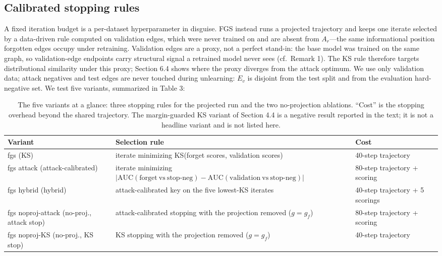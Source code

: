 \documentclass[pdflatex,sn-basic,Numbered]{sn-jnl}
\begin{document}
\subsection{Calibrated stopping rules}
A fixed iteration budget is a per-dataset hyperparameter in disguise. FGS instead runs a projected trajectory and keeps one iterate selected by a data-driven rule computed on validation edges, which were never trained on and are absent from $A_r$---the same informational position forgotten edges occupy under retraining. Validation edges are a proxy, not a perfect stand-in: the base model was trained on the same graph, so validation-edge endpoints carry structural signal a retrained model never sees (cf.\ Remark 1). The KS rule therefore targets distributional similarity under this proxy; Section 6.4 shows where the proxy diverges from the attack optimum. We use only validation data; attack negatives and test edges are never touched during unlearning: $E_v$ is disjoint from the test split and from the evaluation hard-negative set. We test five variants, summarized in Table 3:

\begin{table}[htbp]\centering\small
\caption{The five variants at a glance: three stopping rules for the projected run and the two no-projection ablations. ``Cost'' is the stopping overhead beyond the shared trajectory. The margin-guarded KS variant of Section 4.4 is a negative result reported in the text; it is not a headline variant and is not listed here.}
\begin{tabular}{p{3.2cm}p{5.5cm}p{3.5cm}}\toprule Variant & Selection rule & Cost\\\midrule
fgs (KS) & iterate minimizing KS(forget scores, validation scores) & 40-step trajectory\\
fgs attack (attack-calibrated) & iterate minimizing $|\mathrm{AUC}(\mathrm{forget\ vs\ stop\text{-}neg}) - \mathrm{AUC}(\mathrm{validation\ vs\ stop\text{-}neg})|$ & 80-step trajectory + scoring\\
fgs hybrid (hybrid) & attack-calibrated key on the five lowest-KS iterates & 40-step trajectory + 5 scorings\\
fgs noproj-attack (no-proj., attack stop) & attack-calibrated stopping with the projection removed ($g = g_f$) & 80-step trajectory + scoring\\
fgs noproj-KS (no-proj., KS stop) & KS stopping with the projection removed ($g = g_f$) & 40-step trajectory\\\bottomrule
\end{tabular}\end{table}
\end{document}
